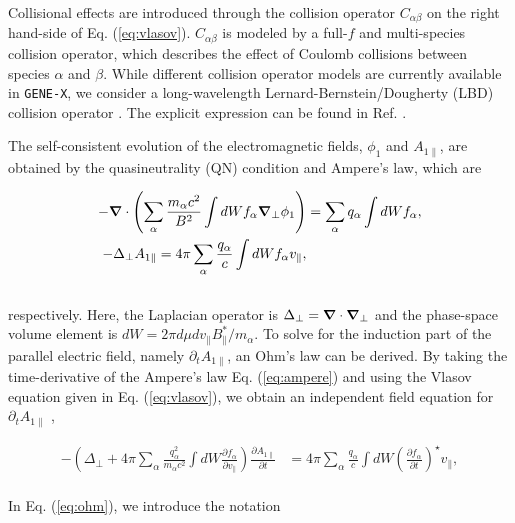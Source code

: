 \documentclass[preprint,12pt]{elsarticle}
\begin{document}
Collisional effects are introduced through the collision operator $C_{\alpha \beta}$ on the right hand-side of Eq. (\ref{eq:vlasov}). $C_{\alpha \beta}$ is modeled by a full-$f$ and multi-species collision operator, which describes the effect of Coulomb collisions between species $\alpha$ and $\beta$. While different collision operator models are currently available in \verb|GENE-X|, we consider a long-wavelength Lernard-Bernstein/Dougherty (LBD) collision operator \cite{lenard1958,dougherty1964}. The explicit expression can be found in Ref. \cite{ulbl2022}. 

The self-consistent evolution of the electromagnetic fields, $\phi_1$ and $A_{1 \parallel}$, are obtained by the quasineutrality (QN) condition and Ampere’s law, which are 

 \begin{subequations} \label{eqs:fields}
 \begin{align}
- \grad   \cdot\left(\sum_\alpha \frac{m_\alpha c^2}{B^2} \int d W f_\alpha \grad _{\perp} \phi_1\right) & =\sum_\alpha q_\alpha \int d W f_\alpha ,  \label{eq:poisson}\\
-\Delta_{\perp} A_{1 \|}  =4 \pi \sum_\alpha \frac{q_\alpha}{c} \int d W f_\alpha v_{\|}  \label{eq:ampere},
\end{align}
\end{subequations}
\\
respectively. Here, the Laplacian operator is $\Delta_{\perp} = \grad \cdot \grad_\perp$ and the phase-space volume element is $d W = 2 \pi d \mu d v_\parallel B_\|^* / m_\alpha$. To solve for the induction part of the parallel electric field, namely $\partial_t A_{1 \parallel}$, an Ohm's law can be derived. By taking the time-derivative of the Ampere's law Eq. (\ref{eq:ampere}) and using the Vlasov equation given in Eq. (\ref{eq:vlasov}), we obtain an independent field equation for $\partial_t A_{1 \parallel}$ \cite{mandell2020},

 \begin{align}
-\left(\Delta_{\perp}+4 \pi \sum_\alpha \frac{q_\alpha^2}{m_\alpha c^2} \int d W \frac{\partial f_\alpha}{\partial v_{\|}}  \right)  \frac{\partial A_{1 \parallel} }{\partial t}  & = 4 \pi \sum_\alpha \frac{q_\alpha}{c} \int d W  \left(\frac{\partial f_\alpha}{\partial t}\right)^{\star} v_{\|} \label{eq:ohm},
\end{align}
\\
In Eq. (\ref{eq:ohm}), we introduce the notation
\end{document}
